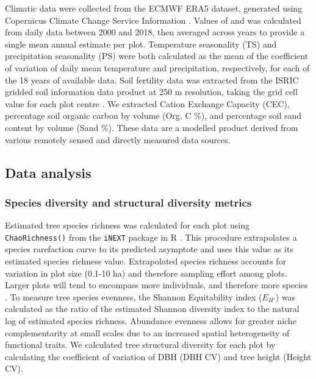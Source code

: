 \documentclass[11pt,a4paper]{article}
\newcommand{\todo}[1]{\textcolor{red}{\textbf{#1}}}   %
\begin{document}
Climatic data were collected from the ECMWF ERA5 dataset, generated using Copernicus Climate Change Service Information \citep{ERA5}. Values of  and  was calculated from daily data between 2000 and 2018, then averaged across years to provide a single mean annual estimate per plot. Temperature seasonality (TS) and precipitation seasonality (PS) were both calculated as the mean of the coefficient of variation of daily mean temperature and precipitation, respectively, for each of the 18 years of available data. Soil fertility data was extracted from the ISRIC gridded soil information data product at 250 m resolution, taking the grid cell value for each plot centre \citep{Hengl2017}. We extracted Cation Exchange Capacity (CEC), percentage soil organic carbon by volume (Org. C \%), and percentage soil sand content by volume (Sand \%). These data are a modelled product derived from various remotely sensed and directly measured data sources. 

% 
% 

\subsection{Data analysis}

\subsubsection{Species diversity and structural diversity metrics}

Estimated tree species richness was calculated for each plot using \verb|ChaoRichness()| from the \verb|iNEXT| package in R \citep{Hsieh2016}. This procedure extrapolates a species rarefaction curve to its predicted asymptote and uses this value as its estimated species richness value. Extrapolated species richness accounts for variation in plot size (0.1-10 ha) and therefore sampling effort among plots. Larger plots will tend to encompass more individuals, and therefore more species \citep{Dengler2009}. To measure tree species  evenness, the Shannon Equitability index ($E_{H'}$) \citep{Smith1996} was calculated as the ratio of the estimated Shannon diversity index to the natural log of estimated species richness. Abundance evenness allows for greater niche complementarity at small scales due to an increased spatial heterogeneity of functional traits. We calculated tree structural diversity for each plot by calculating the coefficient of variation of DBH (DBH CV) and tree height (Height CV). 
\end{document}
